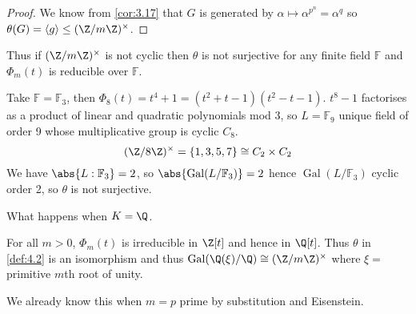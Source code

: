 \documentclass{article}
\DeclareMathOperator{\Gal}{Gal}
\newcommand{\F}{\mathbb{F}}
\begin{document}
\begin{proof}
    We know from \cref{cor:3.17} that $G$ is generated by $\alpha \mapsto \alpha^{p^n} = \alpha^q$ so $\theta(G) = \langle g\rangle \leq (\Z/m\Z)^\times$.
\end{proof}

\begin{remark}
    Thus if $(\Z/m\Z)^\times$ is not cyclic then $\theta$ is not surjective for any finite field $\F$ and $\Phi_m(t)$ is reducible over $\F$.
\end{remark}

\begin{eg}
    Take $\F = \F_3$, then $\Phi_8(t) = t^4 + 1 = (t^2+t-1)(t^2-t-1)$.
    $t^8 - 1$ factorises as a product of linear and quadratic polynomials mod 3, so $L = \F_9$ unique field of order 9 whose multiplicative group is cyclic $C_8$.
    \begin{equation*}
        (\Z/8\Z)^\times = \{1,3,5,7\}\cong C_2 \times C_2
    \end{equation*}
    We have $\abs{L:\F_3} = 2$, so $\abs{\Gal(L/\F_3)}=2$ hence $\Gal(L/\F_3)$ cyclic order 2, so $\theta$ is not surjective.
\end{eg}

What happens when $K = \Q$.
\begin{nthm}\label{thm:4.8}
    For all $m > 0$, $\Phi_m(t)$ is irreducible in $\Z[t]$ and hence in $\Q[t]$.
    Thus $\theta$ in \cref{def:4.2} is an isomorphism and thus $\Gal(\Q(\xi)/\Q) \cong (\Z/m\Z)^\times$ where $\xi =$ primitive $m$th root of unity.
\end{nthm}

\begin{remark}
    We already know this when $m = p$ prime by substitution and Eisenstein.
\end{remark}
\end{document}
